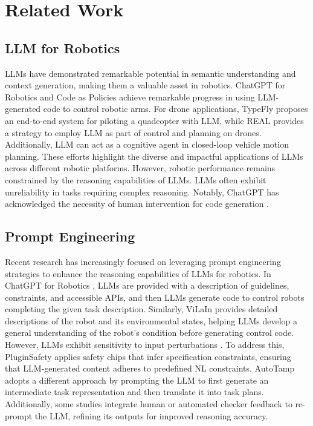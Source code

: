 \section{Related Work}
\label{RelatedWork}

\subsection{LLM for Robotics}
LLMs have demonstrated remarkable potential in semantic understanding and context generation, making them a valuable asset in robotics. ChatGPT for Robotics \cite{ChatGPTRobotics} and Code as Policies \cite{CodeasPolicies} achieve remarkable progress in using LLM-generated code to control robotic arms. For drone applications, TypeFly \cite{TypeFly} proposes an end-to-end system for piloting a quadcopter with LLM, while REAL \cite{REAL} provides a strategy to employ LLM as part of control and planning on drones. Additionally, LLM can act as a cognitive agent in closed-loop vehicle motion planning. \cite{PlanAgent} These efforts highlight the diverse and impactful applications of LLMs across different robotic platforms. However, robotic performance remains constrained by the reasoning capabilities of LLMs. LLMs often exhibit unreliability in tasks requiring complex reasoning.  Notably, ChatGPT has acknowledged the necessity of human intervention for code generation \cite{ChatGPTRobotics}. %

\subsection{Prompt Engineering}
Recent research has increasingly focused on leveraging prompt engineering \cite{PromptEngineering} strategies to enhance the reasoning capabilities of LLMs for robotics. In ChatGPT for Robotics \cite{ChatGPTRobotics}, LLMs are provided with a description of guidelines, constraints, and accessible APIs, and then LLMs generate code to control robots completing the given task description. Similarly, ViLaIn \cite{VisionPlanning} provides detailed descriptions of the robot and its environmental states, helping LLMs develop a general understanding of the robot's condition before generating control code. However, LLMs exhibit sensitivity to input perturbations \cite{JailbreakingLLM, PromptInjection, HighlightSafetyConcern}. To address this, PluginSafety \cite{PluginSafety} applies safety chips that infer specification constraints, ensuring that LLM-generated content adheres to predefined NL constraints. AutoTamp \cite{AutoTAMP} adopts a different approach by prompting the LLM to first generate an intermediate task representation and then translate it into task plans. Additionally, some studies integrate human or automated checker feedback \cite{AutoTAMP, ISR-LLM, Lifelong, EnsureSafety} to re-prompt the LLM, refining its outputs for improved reasoning accuracy.

